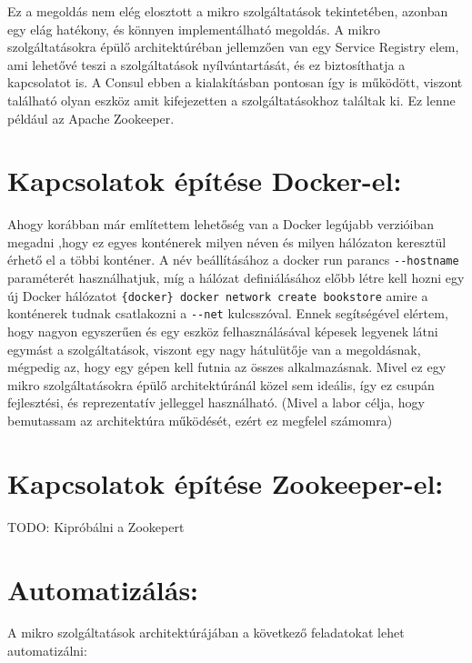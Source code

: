 \documentclass[11pt,magyar,a4paper,oneside,]{report}
\begin{document}
Ez a megoldás nem elég elosztott a mikro szolgáltatások tekintetében,
azonban egy elág hatékony, és könnyen implementálható megoldás. A mikro
szolgáltatásokra épülő architektúréban jellemzően van egy Service
Registry elem, ami lehetővé teszi a szolgáltatások nyílvántartását, és
ez biztosíthatja a kapcsolatot is. A Consul ebben a kialakításban
pontosan így is működött, viszont található olyan eszköz amit
kifejezetten a szolgáltatásokhoz találtak ki. Ez lenne például az Apache
Zookeeper.

\section{Kapcsolatok építése
Docker-el:}\label{kapcsolatok-uxe9puxedtuxe9se-docker-el}

Ahogy korábban már említettem lehetőség van a Docker legújabb verzióiban
megadni ,hogy ez egyes konténerek milyen néven és milyen hálózaton
keresztül érhető el a többi konténer. A név beállításához a docker run
parancs \texttt{-{}-hostname} paraméterét használhatjuk, míg a hálózat
definiálásához előbb létre kell hozni egy új Docker hálózatot
\texttt{\{docker\}   docker network create bookstore} amire a konténerek
tudnak csatlakozni a \texttt{-{}-net} kulcsszóval. Ennek segítségével
elértem, hogy nagyon egyszerűen és egy eszköz felhasználásával képesek
legyenek látni egymást a szolgáltatások, viszont egy nagy hátulütője van
a megoldásnak, mégpedig az, hogy egy gépen kell futnia az összes
alkalmazásnak. Mivel ez egy mikro szolgáltatásokra épülő architektúránál
közel sem ideális, így ez csupán fejlesztési, és reprezentatív jelleggel
használható. (Mivel a labor célja, hogy bemutassam az architektúra
működését, ezért ez megfelel számomra)

\section{Kapcsolatok építése
Zookeeper-el:}\label{kapcsolatok-uxe9puxedtuxe9se-zookeeper-el}

TODO: Kipróbálni a Zookepert

\section{Automatizálás:}\label{automatizuxe1luxe1s}

A mikro szolgáltatások architektúrájában a következő feladatokat lehet
automatizálni:
\end{document}
